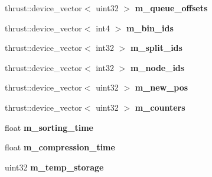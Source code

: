 \begin{DoxyCompactItemize}
\item 
\hypertarget{structnih_1_1cuda_1_1_sah__builder_a4518c47899d587c28045ffd27ba00d9a}{
thrust\-::device\-\_\-vector$<$ uint32 $>$ {\bfseries m\-\_\-queue\-\_\-offsets}}
\label{structnih_1_1cuda_1_1_sah__builder_a4518c47899d587c28045ffd27ba00d9a}

\item 
\hypertarget{structnih_1_1cuda_1_1_sah__builder_abcfa704a67cea3422b016515a7907df3}{
thrust\-::device\-\_\-vector$<$ int4 $>$ {\bfseries m\-\_\-bin\-\_\-ids}}
\label{structnih_1_1cuda_1_1_sah__builder_abcfa704a67cea3422b016515a7907df3}

\item 
\hypertarget{structnih_1_1cuda_1_1_sah__builder_ab42d17b6a5a6a9335e7c3a2b8b15b5f2}{
thrust\-::device\-\_\-vector$<$ int32 $>$ {\bfseries m\-\_\-split\-\_\-ids}}
\label{structnih_1_1cuda_1_1_sah__builder_ab42d17b6a5a6a9335e7c3a2b8b15b5f2}

\item 
\hypertarget{structnih_1_1cuda_1_1_sah__builder_a17da7a61ef5410faf784669ed4c37084}{
thrust\-::device\-\_\-vector$<$ int32 $>$ {\bfseries m\-\_\-node\-\_\-ids}}
\label{structnih_1_1cuda_1_1_sah__builder_a17da7a61ef5410faf784669ed4c37084}

\item 
\hypertarget{structnih_1_1cuda_1_1_sah__builder_a58320098ffc08a6537e730fc6f23ab72}{
thrust\-::device\-\_\-vector$<$ uint32 $>$ {\bfseries m\-\_\-new\-\_\-pos}}
\label{structnih_1_1cuda_1_1_sah__builder_a58320098ffc08a6537e730fc6f23ab72}

\item 
\hypertarget{structnih_1_1cuda_1_1_sah__builder_a197d1e335b6daa417b48e9b5f6952ee0}{
thrust\-::device\-\_\-vector$<$ uint32 $>$ {\bfseries m\-\_\-counters}}
\label{structnih_1_1cuda_1_1_sah__builder_a197d1e335b6daa417b48e9b5f6952ee0}

\item 
\hypertarget{structnih_1_1cuda_1_1_sah__builder_a3221090dde8d9d7171fde754df748cc1}{
float {\bfseries m\-\_\-sorting\-\_\-time}}
\label{structnih_1_1cuda_1_1_sah__builder_a3221090dde8d9d7171fde754df748cc1}

\item 
\hypertarget{structnih_1_1cuda_1_1_sah__builder_a313b20383cdf28eb445f14a1ee354e17}{
float {\bfseries m\-\_\-compression\-\_\-time}}
\label{structnih_1_1cuda_1_1_sah__builder_a313b20383cdf28eb445f14a1ee354e17}

\item 
\hypertarget{structnih_1_1cuda_1_1_sah__builder_a45d46d556fb94208229a1e8fa3e74bb5}{
uint32 {\bfseries m\-\_\-temp\-\_\-storage}}
\label{structnih_1_1cuda_1_1_sah__builder_a45d46d556fb94208229a1e8fa3e74bb5}

\end{DoxyCompactItemize}


